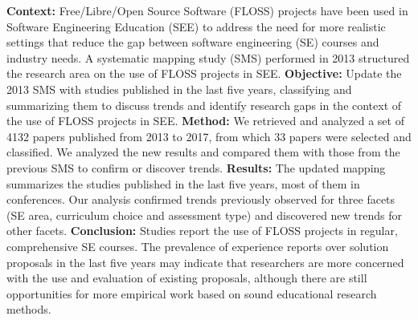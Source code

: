 
\textbf{Context:}
Free/Libre/Open Source Software (FLOSS) projects
have been used in Software Engineering Education (SEE)
to address the need for more realistic settings
that reduce the gap between
software engineering (SE) courses and industry needs.
A systematic mapping study (SMS) performed in 2013
structured the research area on the use of FLOSS projects in SEE.
%
\textbf{Objective:} 
Update the 2013 SMS with studies published in the last five years,
classifying and summarizing them
to discuss trends and identify research gaps
in the context of the use of FLOSS projects in SEE.
%
\textbf{Method:} 
We retrieved and analyzed a set of 4132 papers 
published from 2013 to 2017,
from which 33 papers were selected and classified.
We analyzed the new results and compared them
with those from the previous SMS
to confirm or discover trends.
%
\textbf{Results:} 
The updated mapping summarizes
the studies published in the last five years,
most of them in conferences.
Our analysis confirmed trends previously observed for three facets
(SE area, curriculum choice and assessment type) and discovered new trends for other facets.
%
\textbf{Conclusion:}
Studies report the use of FLOSS projects
in regular, comprehensive SE courses.
The prevalence of experience reports
over solution proposals %
in the last five years may indicate that
researchers are more concerned with the use and evaluation
of existing proposals, although there are still opportunities
for more empirical work based on 
sound educational research methods.

